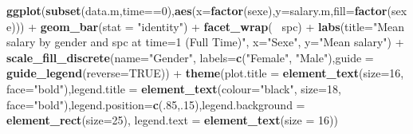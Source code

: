 \documentclass[]{article}
\newenvironment{Shaded}{\begin{snugshade}}{\end{snugshade}}
\newcommand{\KeywordTok}[1]{\textcolor[rgb]{0.13,0.29,0.53}{\textbf{{#1}}}}
\newcommand{\DataTypeTok}[1]{\textcolor[rgb]{0.13,0.29,0.53}{{#1}}}
\newcommand{\DecValTok}[1]{\textcolor[rgb]{0.00,0.00,0.81}{{#1}}}
\newcommand{\StringTok}[1]{\textcolor[rgb]{0.31,0.60,0.02}{{#1}}}
\newcommand{\OtherTok}[1]{\textcolor[rgb]{0.56,0.35,0.01}{{#1}}}
\newcommand{\NormalTok}[1]{{#1}}
\begin{document}
\begin{Shaded}
\begin{Highlighting}[]
{\KeywordTok{ggplot}\NormalTok{(}\KeywordTok{subset}\NormalTok{(data.m,time==}\DecValTok{0}\NormalTok{),}\KeywordTok{aes}\NormalTok{(}\DataTypeTok{x=}\KeywordTok{factor}\NormalTok{(sexe),}\DataTypeTok{y=}\NormalTok{salary.m,}\DataTypeTok{fill=}\KeywordTok{factor}\NormalTok{(sexe))) +}\StringTok{ }
\StringTok{  }\KeywordTok{geom_bar}\NormalTok{(}\DataTypeTok{stat =} \StringTok{"identity"}\NormalTok{) +}\StringTok{ }\KeywordTok{facet_wrap}\NormalTok{(~}\StringTok{ }\NormalTok{spc) +}\StringTok{ }
\StringTok{  }\KeywordTok{labs}\NormalTok{(}\DataTypeTok{title=}\StringTok{"Mean salary by gender and spc at time=1 (Full Time)"}\NormalTok{, }\DataTypeTok{x=}\StringTok{"Sexe"}\NormalTok{, }\DataTypeTok{y=}\StringTok{"Mean salary"}\NormalTok{) +}
\StringTok{  }\KeywordTok{scale_fill_discrete}\NormalTok{(}\DataTypeTok{name=}\StringTok{"Gender"}\NormalTok{,  }\DataTypeTok{labels=}\KeywordTok{c}\NormalTok{(}\StringTok{"Female"}\NormalTok{, }\StringTok{"Male"}\NormalTok{),}\DataTypeTok{guide =} \KeywordTok{guide_legend}\NormalTok{(}\DataTypeTok{reverse=}\OtherTok{TRUE}\NormalTok{)) +}\StringTok{ }
\StringTok{  }\KeywordTok{theme}\NormalTok{(}\DataTypeTok{plot.title =} \KeywordTok{element_text}\NormalTok{(}\DataTypeTok{size=}\DecValTok{16}\NormalTok{, }\DataTypeTok{face=}\StringTok{"bold"}\NormalTok{),}\DataTypeTok{legend.title =} \KeywordTok{element_text}\NormalTok{(}\DataTypeTok{colour=}\StringTok{"black"}\NormalTok{,}
  \DataTypeTok{size=}\DecValTok{18}\NormalTok{, }\DataTypeTok{face=}\StringTok{"bold"}\NormalTok{),}\DataTypeTok{legend.position=}\KeywordTok{c}\NormalTok{(.}\DecValTok{85}\NormalTok{,.}\DecValTok{15}\NormalTok{),}\DataTypeTok{legend.background =} \KeywordTok{element_rect}\NormalTok{(}\DataTypeTok{size=}\DecValTok{25}\NormalTok{),}
  \DataTypeTok{legend.text =} \KeywordTok{element_text}\NormalTok{(}\DataTypeTok{size =} \DecValTok{16}\NormalTok{))}

}
\end{Highlighting}
\end{Shaded}
\end{document}
